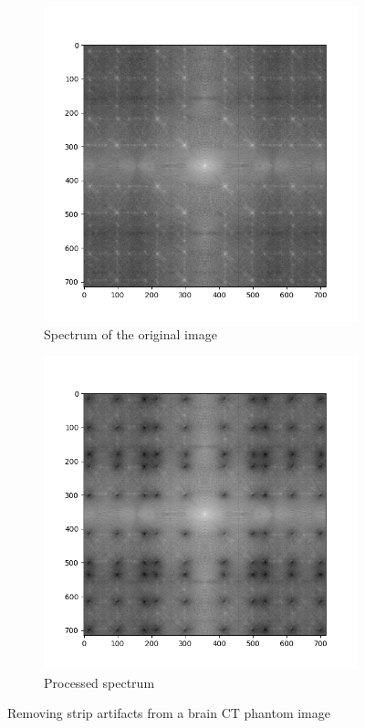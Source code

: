 \documentclass[UTF8]{ctexart}
\begin{document}
\begin{figure}[htbp]
    \vspace{0.3cm}

    \begin{subfigure}{0.5\textwidth}
        \centering
        \includegraphics[width=1\linewidth]{hw4_spectrum.png}
        \caption{Spectrum of the original image}
    \end{subfigure}%
    \hfill
    \begin{subfigure}{0.5\textwidth}
        \centering
        \includegraphics[width=1\linewidth]{ctfreq.png}
        \caption{Processed spectrum}
    \end{subfigure}

    \caption{Removing strip artifacts from a brain CT phantom image}
\end{figure}
\end{document}
